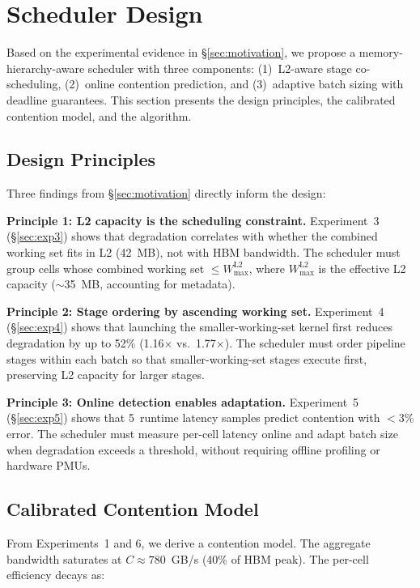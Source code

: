 \section{Scheduler Design}
\label{sec:design}

Based on the experimental evidence in \S\ref{sec:motivation}, we propose a memory-hierarchy-aware scheduler with three components: (1)~L2-aware stage co-scheduling, (2)~online contention prediction, and (3)~adaptive batch sizing with deadline guarantees. This section presents the design principles, the calibrated contention model, and the algorithm.

\subsection{Design Principles}

Three findings from \S\ref{sec:motivation} directly inform the design:

\textbf{Principle 1: L2 capacity is the scheduling constraint.} Experiment~3 (\S\ref{sec:exp3}) shows that degradation correlates with whether the combined working set fits in L2 (42~MB), not with HBM bandwidth. The scheduler must group cells whose combined working set $\leq W^{\text{L2}}_{\text{max}}$, where $W^{\text{L2}}_{\text{max}}$ is the effective L2 capacity ($\sim$35~MB, accounting for metadata).

\textbf{Principle 2: Stage ordering by ascending working set.} Experiment~4 (\S\ref{sec:exp4}) shows that launching the smaller-working-set kernel first reduces degradation by up to 52\% (1.16$\times$ vs.\ 1.77$\times$). The scheduler must order pipeline stages within each batch so that smaller-working-set stages execute first, preserving L2 capacity for larger stages.

\textbf{Principle 3: Online detection enables adaptation.} Experiment~5 (\S\ref{sec:exp5}) shows that 5~runtime latency samples predict contention with $<$3\% error. The scheduler must measure per-cell latency online and adapt batch size when degradation exceeds a threshold, without requiring offline profiling or hardware PMUs.

\subsection{Calibrated Contention Model}
\label{sec:model}

From Experiments~1 and 6, we derive a contention model. The aggregate bandwidth saturates at $C \approx 780$~GB/s (40\% of HBM peak). The per-cell efficiency decays as:

